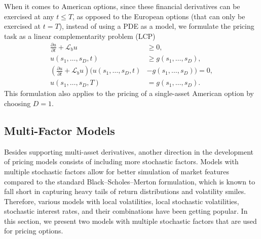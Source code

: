 \documentclass{UUThesisTemplate}
\begin{document}
\par
When it comes to American options, since these financial derivatives can be exercised at any $t \leq T$, as opposed to the European options (that can only be exercised at $t=T$), instead of using a PDE as a model, we formulate the pricing task as a linear complementarity problem (LCP)
\begin{align}
\frac{\partial u}{\partial t}+\mathcal{L}_b u&\geq 0,\nonumber \\
u(s_1,\ldots, s_D,t)&\geq g(s_1,\ldots, s_D), \nonumber \\
\left( \frac{\partial u}{\partial t}+\mathcal{L}_b u\right) \big(u(s_1,\ldots, s_D,t) &-g(s_1,\ldots, s_D)\big)=0, \nonumber \\ 
u(s_1,\ldots,s_D,T)&=g(s_1,\ldots,s_D). \label{eqlcp}
\end{align}
This formulation also applies to the pricing of a single-asset American option by choosing $D=1$. 
%



%
\subsection{Multi-Factor Models}
\label{sub:multifactor}

\par
Besides supporting multi-asset derivatives, another direction in the development of pricing models consists of including more stochastic factors. Models with multiple stochastic factors allow for better simulation of market features compared to the standard Black--Scholes--Merton formulation, which is known to fall short in capturing heavy tails of return distributions and volatility smiles. Therefore, various models with local volatilities, local stochastic volatilities, stochastic interest rates, and their combinations have been getting popular. In this section, we present two models with multiple stochastic factors that are used for pricing options.
\end{document}
